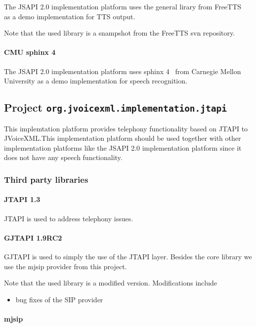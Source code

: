 \documentclass[11pt,a4paper]{article}
\begin{document}
The JSAPI 2.0 implementation platform uses the general lirary from
FreeTTS~\cite{freetts} as a demo implementation for TTS output.

Note that the used library is a snampshot from the FreeTTS svn repository.

\paragraph{CMU sphinx 4}
\label{sec:sphinx}

The JSAPI 2.0 implementation platform uses sphinx 4~\cite{sphinx} from
Carnegie Mellon University as a demo implementation for speech recognition.

\subsection{Project \lstinline{org.jvoicexml.implementation.jtapi}}

This implemtation platform provides telephony functionality based on JTAPI to
JVoiceXML.This implementation platform should be used together with other
implementation platforms like the JSAPI 2.0 implementation platform since it
does not have any speech functionality.


\subsubsection{Third party libraries}
\label{sec:jtapi-third-party-libr}

\paragraph{JTAPI 1.3}

JTAPI is used to address telephony issues.

\paragraph{GJTAPI 1.9RC2}

GJTAPI is used to simply the use of the JTAPI layer. Besides the core library
we use the mjsip provider from this project.

Note that the used library is a modified version. Modifications include
\begin{itemize}
\item bug fixes of the SIP provider
\end{itemize}

\paragraph{mjsip}
\end{document}
